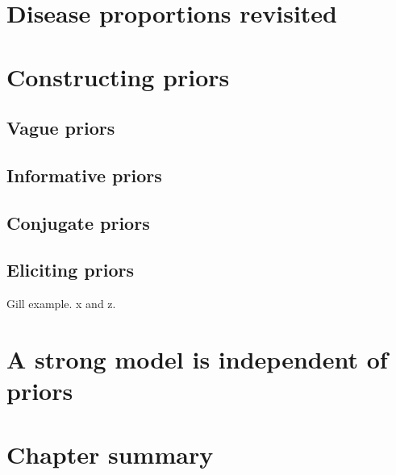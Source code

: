 \documentclass[11pt,fullpage]{book}
\begin{document}
\section{Disease proportions revisited}
\section{Constructing priors}
\subsection{Vague priors}
\subsection{Informative priors}
\subsection{Conjugate priors}
\subsection{Eliciting priors}
Gill example. x and z.
\section{A strong model is independent of priors}
\section{Chapter summary}





\end{document}
